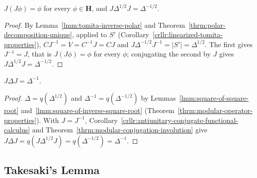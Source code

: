 \begin{theorem}[$J$ is an Involution and $J\Delta^{1/2}J = \Delta^{-1/2}$]
    \label{thrm:modular-conjugation-involution}
    \leanok
    $J(J\phi) = \phi$ for every $\phi \in \mathbf{H}$, and $J\Delta^{1/2}J = \Delta^{-1/2}$.
\end{theorem}
\begin{proof}
    \leanok
    By Lemma~\ref{lmm:tomita-inverse-polar} and Theorem~\ref{thrm:polar-decomposition-unique}, applied to $S'$ (Corollary~\ref{crllr:linearized-tomita-properties}), $CJ^{-1} = V = C^{-1}J = CJ$ and $J\Delta^{-1/2}J^{-1} = |S'| = \Delta^{1/2}$. The first gives $J^{-1} = J$, that is $J(J\phi) = \phi$ for every $\phi$; conjugating the second by $J$ gives $J\Delta^{1/2}J = \Delta^{-1/2}$.
\end{proof}

\begin{corollary}[$J\Delta J = \Delta^{-1}$]
    \label{crllr:modular-conjugation-inverts}
    \leanok
    $J\Delta J = \Delta^{-1}$.
\end{corollary}
\begin{proof}
    \leanok
    $\Delta = q(\Delta^{1/2})$ and $\Delta^{-1} = q(\Delta^{-1/2})$ by Lemmas~\ref{lmm:square-of-square-root} and~\ref{lmm:square-of-inverse-square-root} (Theorem~\ref{thrm:modular-operator-properties}). With $J = J^{-1}$, Corollary~\ref{crllr:antiunitary-conjugate-functional-calculus} and Theorem~\ref{thrm:modular-conjugation-involution} give $J\Delta J = q(J\Delta^{1/2}J) = q(\Delta^{-1/2}) = \Delta^{-1}$.
\end{proof}

\subsection{Takesaki's Lemma}\label{sbsctn:takesaki-lemma}

